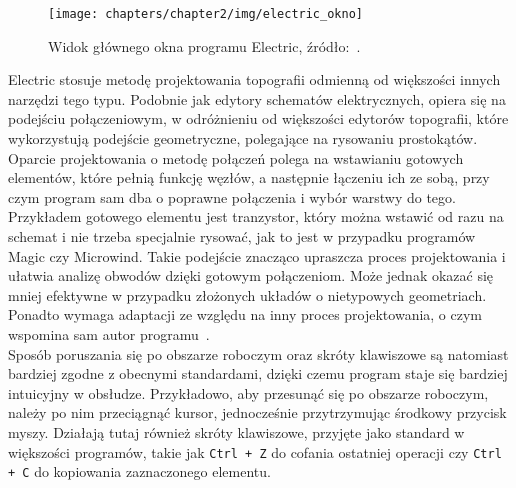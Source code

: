 \begin{figure}[h]
    \centering
    \texttt{[image: chapters/chapter2/img/electric\_okno]}
    \caption[Widok głównego okna programu Electric.]{Widok głównego okna programu Electric, źródło:~\cite{electric_sfs}.}
    \label{fig:electric_okno}
\end{figure}
\indent Electric stosuje metodę projektowania topografii odmienną od większości innych narzędzi tego typu.
Podobnie jak edytory schematów elektrycznych, opiera się na podejściu połączeniowym,
w odróżnieniu od większości edytorów topografii, które wykorzystują podejście geometryczne,
polegające na rysowaniu prostokątów.
Oparcie projektowania o metodę połączeń polega na wstawianiu gotowych elementów,
które pełnią funkcję węzłów, %
a następnie łączeniu ich ze sobą, przy czym program sam dba o poprawne połączenia i wybór warstwy do tego.
Przykładem gotowego elementu jest tranzystor,
który można wstawić od razu na schemat
i nie trzeba specjalnie rysować, jak to jest w przypadku programów Magic czy Microwind.
Takie podejście znacząco upraszcza proces projektowania i ułatwia analizę obwodów dzięki gotowym połączeniom.
Może jednak okazać się mniej efektywne w przypadku złożonych układów o nietypowych geometriach.
Ponadto wymaga adaptacji ze względu na inny proces projektowania,
o czym wspomina sam autor programu~\cite{electric_computer_aids}.\\
Sposób poruszania się po obszarze roboczym oraz skróty klawiszowe są natomiast bardziej zgodne z obecnymi standardami,
dzięki czemu program staje się bardziej intuicyjny w obsłudze.
Przykładowo, aby przesunąć się po obszarze roboczym, należy po nim przeciągnąć kursor,
jednocześnie przytrzymując środkowy przycisk myszy.
Działają tutaj również skróty klawiszowe, przyjęte jako standard w większości programów,
takie jak \texttt{Ctrl + Z} do cofania ostatniej operacji czy \texttt{Ctrl + C} do kopiowania zaznaczonego elementu.
